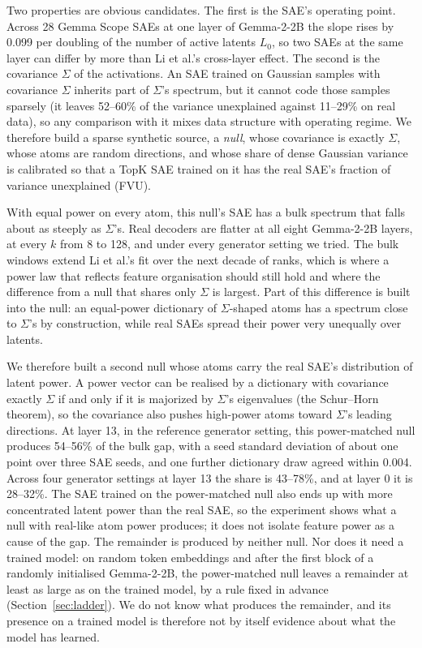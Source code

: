 \documentclass{article}
\newcommand{\Sig}{\Sigma}
\newcommand{\Lz}{L_0}
\begin{document}
Two properties are obvious candidates. The first is the SAE's operating point. Across 28 Gemma Scope SAEs at one layer of Gemma-2-2B the slope rises by 0.099 per doubling of the number of active latents $\Lz$, so two SAEs at the same layer can differ by more than Li et al.'s cross-layer effect. The second is the covariance $\Sig$ of the activations. An SAE trained on Gaussian samples with covariance $\Sig$ inherits part of $\Sig$'s spectrum, but it cannot code those samples sparsely (it leaves 52--60\% of the variance unexplained against 11--29\% on real data), so any comparison with it mixes data structure with operating regime. We therefore build a sparse synthetic source, a \emph{null}, whose covariance is exactly $\Sig$, whose atoms are random directions, and whose share of dense Gaussian variance is calibrated so that a TopK SAE \citep{gao2024scaling} trained on it has the real SAE's fraction of variance unexplained (FVU).

With equal power on every atom, this null's SAE has a bulk spectrum that falls about as steeply as $\Sig$'s. Real decoders are flatter at all eight Gemma-2-2B layers, at every $k$ from 8 to 128, and under every generator setting we tried. The bulk windows extend Li et al.'s fit over the next decade of ranks, which is where a power law that reflects feature organisation should still hold and where the difference from a null that shares only $\Sig$ is largest. Part of this difference is built into the null: an equal-power dictionary of $\Sig$-shaped atoms has a spectrum close to $\Sig$'s by construction, while real SAEs spread their power very unequally over latents.

We therefore built a second null whose atoms carry the real SAE's distribution of latent power. A power vector can be realised by a dictionary with covariance exactly $\Sig$ if and only if it is majorized by $\Sig$'s eigenvalues (the Schur--Horn theorem), so the covariance also pushes high-power atoms toward $\Sig$'s leading directions. At layer 13, in the reference generator setting, this power-matched null produces 54--56\% of the bulk gap, with a seed standard deviation of about one point over three SAE seeds, and one further dictionary draw agreed within 0.004. Across four generator settings at layer 13 the share is 43--78\%, and at layer 0 it is 28--32\%. The SAE trained on the power-matched null also ends up with more concentrated latent power than the real SAE, so the experiment shows what a null with real-like atom power produces; it does not isolate feature power as a cause of the gap. The remainder is produced by neither null. Nor does it need a trained model: on random token embeddings and after the first block of a randomly initialised Gemma-2-2B, the power-matched null leaves a remainder at least as large as on the trained model, by a rule fixed in advance (Section~\ref{sec:ladder}). We do not know what produces the remainder, and its presence on a trained model is therefore not by itself evidence about what the model has learned.
\end{document}
